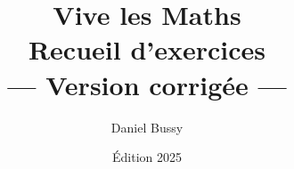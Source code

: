 \documentclass[12pt, a4paper]{book}
\begin{document}
\title{{\Huge\textbf{Vive les Maths}}\\[0.5em]
       \large Recueil d'exercices
       \ifdefined\AVECSOLUTIONS
         \\[0.3em]\textcolor{vlmgreen}{\large — Version corrigée —}
       \fi}
\author{Daniel Bussy}
\date{Édition 2025}
\maketitle
\tableofcontents

\newpage
\end{document}
